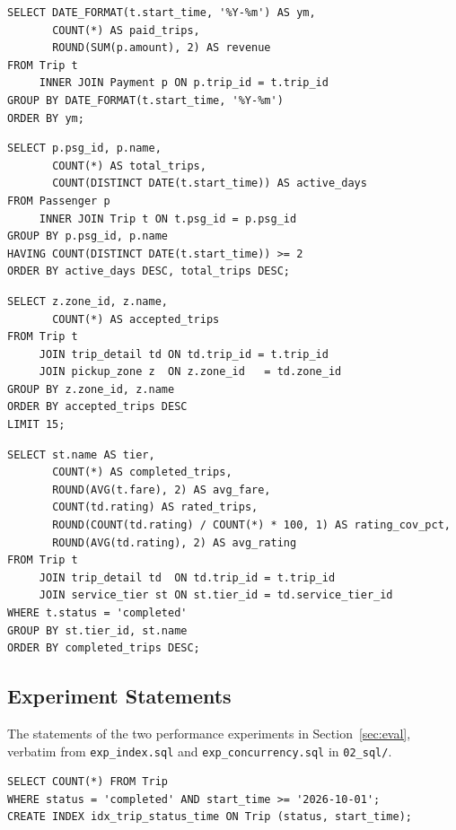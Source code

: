 \begin{lstlisting}[caption={Q7: monthly revenue.}]
SELECT DATE_FORMAT(t.start_time, '%Y-%m') AS ym,
       COUNT(*) AS paid_trips,
       ROUND(SUM(p.amount), 2) AS revenue
FROM Trip t
     INNER JOIN Payment p ON p.trip_id = t.trip_id
GROUP BY DATE_FORMAT(t.start_time, '%Y-%m')
ORDER BY ym;
\end{lstlisting}

\begin{lstlisting}[caption={Q8: repeat passengers.}]
SELECT p.psg_id, p.name,
       COUNT(*) AS total_trips,
       COUNT(DISTINCT DATE(t.start_time)) AS active_days
FROM Passenger p
     INNER JOIN Trip t ON t.psg_id = p.psg_id
GROUP BY p.psg_id, p.name
HAVING COUNT(DISTINCT DATE(t.start_time)) >= 2
ORDER BY active_days DESC, total_trips DESC;
\end{lstlisting}

\begin{lstlisting}[caption={Q9: accepted trips per zone.}]
SELECT z.zone_id, z.name,
       COUNT(*) AS accepted_trips
FROM Trip t
     JOIN trip_detail td ON td.trip_id = t.trip_id
     JOIN pickup_zone z  ON z.zone_id   = td.zone_id
GROUP BY z.zone_id, z.name
ORDER BY accepted_trips DESC
LIMIT 15;
\end{lstlisting}

\begin{lstlisting}[caption={Q10: service tier vs.\ rating.}]
SELECT st.name AS tier,
       COUNT(*) AS completed_trips,
       ROUND(AVG(t.fare), 2) AS avg_fare,
       COUNT(td.rating) AS rated_trips,
       ROUND(COUNT(td.rating) / COUNT(*) * 100, 1) AS rating_cov_pct,
       ROUND(AVG(td.rating), 2) AS avg_rating
FROM Trip t
     JOIN trip_detail td  ON td.trip_id = t.trip_id
     JOIN service_tier st ON st.tier_id = td.service_tier_id
WHERE t.status = 'completed'
GROUP BY st.tier_id, st.name
ORDER BY completed_trips DESC;
\end{lstlisting}

\subsection{Experiment Statements}
\label{app:expsql}
The statements of the two performance experiments in Section~\ref{sec:eval}, verbatim from \texttt{exp\_index.sql} and \texttt{exp\_concurrency.sql} in \texttt{02\_sql/}.

\begin{lstlisting}[caption={Experiment 1: index target query and composite index creation.}]
SELECT COUNT(*) FROM Trip
WHERE status = 'completed' AND start_time >= '2026-10-01';
CREATE INDEX idx_trip_status_time ON Trip (status, start_time);
\end{lstlisting}

